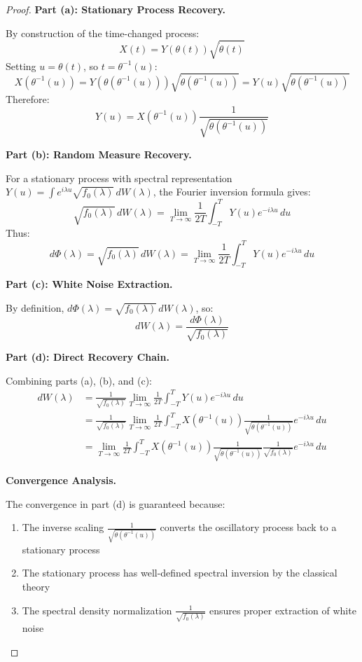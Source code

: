 \documentclass{article}
\begin{document}
\begin{proof}
\textbf{Part (a): Stationary Process Recovery.}

By construction of the time-changed process:
\[
X(t) = Y(\theta(t)) \sqrt{\dot\theta(t)}
\]
Setting $u = \theta(t)$, so $t = \theta^{-1}(u)$:
\[
X(\theta^{-1}(u)) = Y(\theta(\theta^{-1}(u))) \sqrt{\dot\theta(\theta^{-1}(u))} = Y(u) \sqrt{\dot\theta(\theta^{-1}(u))}
\]
Therefore:
\[
Y(u) = X(\theta^{-1}(u)) \frac{1}{\sqrt{\dot\theta(\theta^{-1}(u))}}
\]

\textbf{Part (b): Random Measure Recovery.}

For a stationary process with spectral representation $Y(u) = \int e^{i\lambda u} \sqrt{f_0(\lambda)}\, dW(\lambda)$, the Fourier inversion formula gives:
\[
\sqrt{f_0(\lambda)}\, dW(\lambda) = \lim_{T\to\infty} \frac{1}{2T} \int_{-T}^T Y(u) e^{-i\lambda u}\, du
\]
Thus:
\[
d\Phi(\lambda) = \sqrt{f_0(\lambda)}\, dW(\lambda) = \lim_{T\to\infty} \frac{1}{2T} \int_{-T}^T Y(u) e^{-i\lambda u}\, du
\]

\textbf{Part (c): White Noise Extraction.}

By definition, $d\Phi(\lambda) = \sqrt{f_0(\lambda)}\, dW(\lambda)$, so:
\[
dW(\lambda) = \frac{d\Phi(\lambda)}{\sqrt{f_0(\lambda)}}
\]

\textbf{Part (d): Direct Recovery Chain.}

Combining parts (a), (b), and (c):
\begin{align}
dW(\lambda) &= \frac{1}{\sqrt{f_0(\lambda)}} \lim_{T\to\infty} \frac{1}{2T} \int_{-T}^T Y(u) e^{-i\lambda u}\, du \\
&= \frac{1}{\sqrt{f_0(\lambda)}} \lim_{T\to\infty} \frac{1}{2T} \int_{-T}^T X(\theta^{-1}(u)) \frac{1}{\sqrt{\dot\theta(\theta^{-1}(u))}} e^{-i\lambda u}\, du \\
&= \lim_{T\to\infty} \frac{1}{2T} \int_{-T}^T X(\theta^{-1}(u)) \frac{1}{\sqrt{\dot\theta(\theta^{-1}(u))}} \frac{1}{\sqrt{f_0(\lambda)}} e^{-i\lambda u}\, du
\end{align}

\textbf{Convergence Analysis.}

The convergence in part (d) is guaranteed because:
\begin{enumerate}
\item The inverse scaling $\frac{1}{\sqrt{\dot\theta(\theta^{-1}(u))}}$ converts the oscillatory process back to a stationary process
\item The stationary process has well-defined spectral inversion by the classical theory
\item The spectral density normalization $\frac{1}{\sqrt{f_0(\lambda)}}$ ensures proper extraction of white noise
\end{enumerate}

\end{proof}
\end{document}
